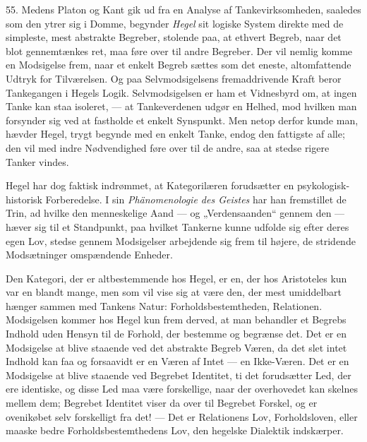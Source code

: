 \documentclass[12pt,a4paper]{book}
\newcommand{\apage}[1]{\marginnote{\footnotesize\textit{[#1]}}}
\begin{document}
55. Medens Platon og Kant gik ud fra en Analyse af Tankevirksomheden,
saaledes som den ytrer sig i Domme, begynder \emph{Hegel} sit logiske
System direkte med de simpleste, mest abstrakte Begreber, stolende paa,
at ethvert Begreb, naar det blot gennemtænkes ret, maa føre over til
andre Begreber. Der vil nemlig komme en Modsigelse frem, naar et enkelt
Begreb sættes som det eneste, altomfattende Udtryk for Tilværelsen. Og
paa Selvmodsigelsens fremaddrivende Kraft beror Tankegangen i Hegels
Logik. Selvmodsigelsen er ham et Vidnesbyrd om, at ingen Tanke kan staa
isoleret, --- at Tankeverdenen udgør en Helhed, mod hvilken man forsynder
sig ved at fastholde et enkelt Synspunkt. Men netop derfor kunde man,
hævder Hegel, trygt begynde med en enkelt Tanke, endog den fattigste af
alle; den vil med indre Nødvendighed føre over til de andre, saa at
stedse rigere Tanker vindes.

Hegel har dog faktisk indrømmet, at Kategorilæren forudsætter en
psykologisk-historisk Forberedelse. I sin \emph{Phänomenologie des
Geistes} har han fremstillet de Trin, ad hvilke den menneskelige Aand ---
og „Verdensaanden“ gennem den --- hæver sig til et Standpunkt, paa
hvilket Tankerne kunne udfolde sig efter deres egen Lov, stedse gennem
Modsigelser arbejdende sig frem til højere, de stridende Modsætninger
omspændende Enheder.

Den Kategori, der er altbestemmende hos Hegel, er en, der hos Aristoteles
kun var en blandt mange, men som vil \apage{148} vise sig at være den, der mest
umiddelbart hænger sammen med Tankens Natur: Forholdsbestemtheden,
Relationen. Modsigelsen kommer hos Hegel kun frem derved, at man
behandler et Begrebs Indhold uden Hensyn til de Forhold, der bestemme og
begrænse det. Det er en Modsigelse at blive staaende ved det abstrakte
Begreb Væren, da det slet intet Indhold kan faa og forsaavidt er en Væren
af Intet --- en Ikke-Væren. Det er en Modsigelse at blive staaende ved
Begrebet Identitet, ti det forudsætter Led, der ere identiske, og disse
Led maa være forskellige, naar der overhovedet kan skelnes mellem dem;
Begrebet Identitet viser da over til Begrebet Forskel, og er ovenikøbet
selv forskelligt fra det! --- Det er Relationens Lov, Forholdsloven,
eller maaske bedre Forholdsbestemthedens Lov, den hegelske Dialektik
indskærper.
\end{document}
